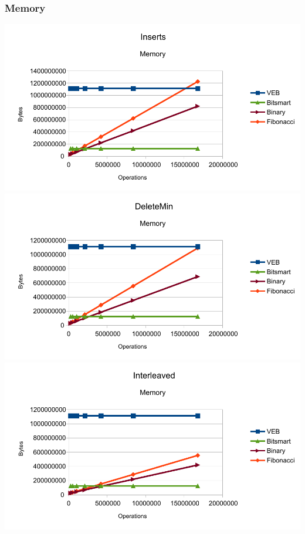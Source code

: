 \subsubsection{Memory}
\includegraphics[width=\textwidth]{graphs/Inserts_memory.pdf}
\includegraphics[width=\textwidth]{graphs/DeleteMin_memory.pdf}
\includegraphics[width=\textwidth]{graphs/Interleaved_memory.pdf}



